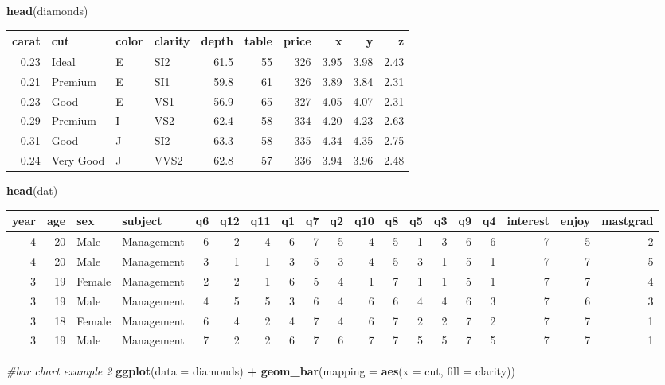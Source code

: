 \documentclass[]{article}
\newenvironment{Shaded}{\begin{snugshade}}{\end{snugshade}}
\newcommand{\CommentTok}[1]{\textcolor[rgb]{0.56,0.35,0.01}{\textit{#1}}}
\newcommand{\DataTypeTok}[1]{\textcolor[rgb]{0.13,0.29,0.53}{#1}}
\newcommand{\KeywordTok}[1]{\textcolor[rgb]{0.13,0.29,0.53}{\textbf{#1}}}
\newcommand{\NormalTok}[1]{#1}
\newcommand{\OperatorTok}[1]{\textcolor[rgb]{0.81,0.36,0.00}{\textbf{#1}}}
\newcommand{\StringTok}[1]{\textcolor[rgb]{0.31,0.60,0.02}{#1}}
\begin{document}
\begin{Shaded}
\begin{Highlighting}[]
\KeywordTok{head}\NormalTok{(diamonds)}
\end{Highlighting}
\end{Shaded}

\begin{longtable}[]{@{}rlllrrrrrr@{}}
\toprule
carat & cut & color & clarity & depth & table & price & x & y &
z\tabularnewline
\midrule
\endhead
0.23 & Ideal & E & SI2 & 61.5 & 55 & 326 & 3.95 & 3.98 &
2.43\tabularnewline
0.21 & Premium & E & SI1 & 59.8 & 61 & 326 & 3.89 & 3.84 &
2.31\tabularnewline
0.23 & Good & E & VS1 & 56.9 & 65 & 327 & 4.05 & 4.07 &
2.31\tabularnewline
0.29 & Premium & I & VS2 & 62.4 & 58 & 334 & 4.20 & 4.23 &
2.63\tabularnewline
0.31 & Good & J & SI2 & 63.3 & 58 & 335 & 4.34 & 4.35 &
2.75\tabularnewline
0.24 & Very Good & J & VVS2 & 62.8 & 57 & 336 & 3.94 & 3.96 &
2.48\tabularnewline
\bottomrule
\end{longtable}

\begin{Shaded}
\begin{Highlighting}[]
\KeywordTok{head}\NormalTok{(dat)}
\end{Highlighting}
\end{Shaded}

\begin{longtable}[]{@{}rrllrrrrrrrrrrrrrrr@{}}
\toprule
year & age & sex & subject & q6 & q12 & q11 & q1 & q7 & q2 & q10 & q8 &
q5 & q3 & q9 & q4 & interest & enjoy & mastgrad\tabularnewline
\midrule
\endhead
4 & 20 & Male & Management & 6 & 2 & 4 & 6 & 7 & 5 & 4 & 5 & 1 & 3 & 6 &
6 & 7 & 5 & 2\tabularnewline
4 & 20 & Male & Management & 3 & 1 & 1 & 3 & 5 & 3 & 4 & 5 & 3 & 1 & 5 &
1 & 7 & 7 & 5\tabularnewline
3 & 19 & Female & Management & 2 & 2 & 1 & 6 & 5 & 4 & 1 & 7 & 1 & 1 & 5
& 1 & 7 & 7 & 4\tabularnewline
3 & 19 & Male & Management & 4 & 5 & 5 & 3 & 6 & 4 & 6 & 6 & 4 & 4 & 6 &
3 & 7 & 6 & 3\tabularnewline
3 & 18 & Female & Management & 6 & 4 & 2 & 4 & 7 & 4 & 6 & 7 & 2 & 2 & 7
& 2 & 7 & 7 & 1\tabularnewline
3 & 19 & Male & Management & 7 & 2 & 2 & 6 & 7 & 6 & 7 & 7 & 5 & 5 & 7 &
5 & 7 & 7 & 1\tabularnewline
\bottomrule
\end{longtable}

\begin{Shaded}
\begin{Highlighting}[]
\CommentTok{#bar chart example 2}
\KeywordTok{ggplot}\NormalTok{(}\DataTypeTok{data =}\NormalTok{ diamonds) }\OperatorTok{+}\StringTok{ }
\StringTok{  }\KeywordTok{geom_bar}\NormalTok{(}\DataTypeTok{mapping =} \KeywordTok{aes}\NormalTok{(}\DataTypeTok{x =}\NormalTok{ cut, }\DataTypeTok{fill =}\NormalTok{ clarity))}
\end{Highlighting}
\end{Shaded}
\end{document}
